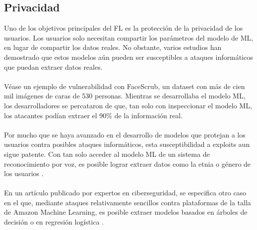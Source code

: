 \subsection{Privacidad}
Uno de los objetivos principales del FL es la protección de la privacidad de los usuarios. Los usuarios solo necesitan compartir los parámetros del modelo de ML, en lugar de compartir los datos reales. No obstante, varios estudios han demostrado que estos modelos aún pueden ser susceptibles a ataques informáticos que puedan extraer datos reales.
\\ \\
Véase un ejemplo de vulnerabilidad con FaceScrub, un dataset con más de cien mil imágenes de caras de 530 personas. Mientras se desarrollaba el modelo ML, los desarrolladores se percataron de que, tan solo con inspeccionar el modelo ML, los atacantes podían extraer el 90\% de la información real.
\\ \\
Por mucho que se haya avanzado en el desarrollo de modelos que protejan a los usuarios contra posibles ataques informáticos, esta susceptibilidad a exploits aun sigue patente. Con tan solo acceder al modelo ML de un sistema de reconocimiento por voz, es posible lograr extraer datos como la etnia o género de los usuarios \autocite{melis2018exploiting}. 
\\ \\
En un artículo publicado por expertos en ciberseguridad, se especifica otro caso en el que, mediante ataques relativamente sencillos contra plataformas de la talla de Amazon Machine Learning, es posible extraer modelos basados en árboles de decisión o en regresión logística \autocite{tramèr2016stealing}.

